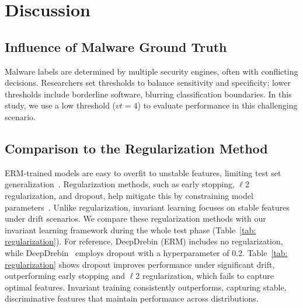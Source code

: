 \section{Discussion}
\subsection{Influence of Malware Ground Truth}
Malware labels are determined by multiple security engines, often with conflicting decisions. Researchers set thresholds to balance sensitivity and specificity; lower thresholds include borderline software, blurring classification boundaries. In this study, we use a low threshold (\(vt = 4\)) to evaluate performance in this challenging scenario.



\subsection{Comparison to the Regularization Method}
ERM-trained models are easy to overfit to unstable features, limiting test set generalization~\cite{regularization}. Regularization methods, such as early stopping, $\ell$2 regularization, and dropout, help mitigate this by constraining model parameters~\cite{regularization_understanding}. Unlike regularization, invariant learning focuses on stable features under drift scenarios. We compare these regularization methods with our invariant learning framework during the whole test phase (Table~\ref{tab: regularization}). For reference, DeepDrebin (ERM) includes no regularization, while DeepDrebin~\cite{Grossedeepdrebin} employs dropout with a hyperparameter of 0.2. Table~\ref{tab: regularization} shows dropout improves performance under significant drift, outperforming early stopping and $\ell$2 regularization, which fails to capture optimal features. Invariant training consistently outperforms, capturing stable, discriminative features that maintain performance across distributions.

